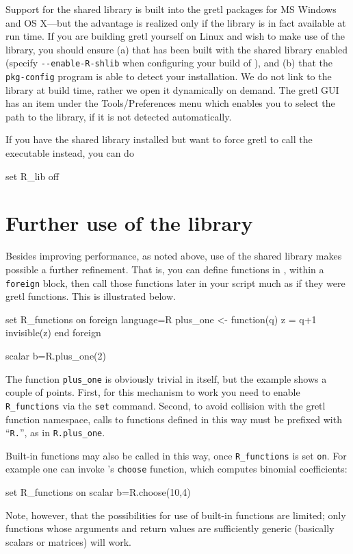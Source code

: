 Support for the  shared library is built into the gretl
packages for MS Windows and OS X---but the advantage is realized
only if the library is in fact available at run time.  If you are
building gretl yourself on Linux and wish to make use of the
 library, you should ensure (a) that  has been built
with the shared library enabled (specify \verb|--enable-R-shlib| when
configuring your build of ), and (b) that the \verb|pkg-config|
program is able to detect your  installation.  We do not link
to the  library at build time, rather we open it dynamically on
demand. The gretl GUI has an item under the
\textsf{Tools/Preferences} menu which enables you to select the
path to the library, if it is not detected automatically.  

If you have the  shared library installed but want to force
gretl to call the  executable instead, you can do
\begin{code}
set R_lib off
\end{code}

\section{Further use of the  library}
\label{sec:R-functions}

Besides improving performance, as noted above, use of the 
shared library makes possible a further refinement.  That is, you can
define functions in , within a \texttt{foreign} block, then
call those functions later in your script much as if they were
gretl functions.  This is illustrated below.  
%
\begin{code}
set R_functions on
foreign language=R
  plus_one <- function(q) {
     z = q+1
     invisible(z)
  }
end foreign

scalar b=R.plus_one(2)
\end{code}
%
The  function \verb|plus_one| is obviously trivial in itself,
but the example shows a couple of points.  First, for this mechanism
to work you need to enable \verb|R_functions| via the \texttt{set}
command.  Second, to avoid collision with the gretl function
namespace, calls to functions defined in this way must be prefixed
with ``\texttt{R.}'', as in \verb|R.plus_one|.

Built-in  functions may also be called in this way, once
\verb|R_functions| is set \texttt{on}.  For example one can invoke
's \texttt{choose} function, which computes binomial
coefficients:
%
\begin{code}
set R_functions on
scalar b=R.choose(10,4)
\end{code}
%
Note, however, that the possibilities for use of built-in 
functions are limited; only functions whose arguments and return
values are sufficiently generic (basically scalars or matrices) will
work.


